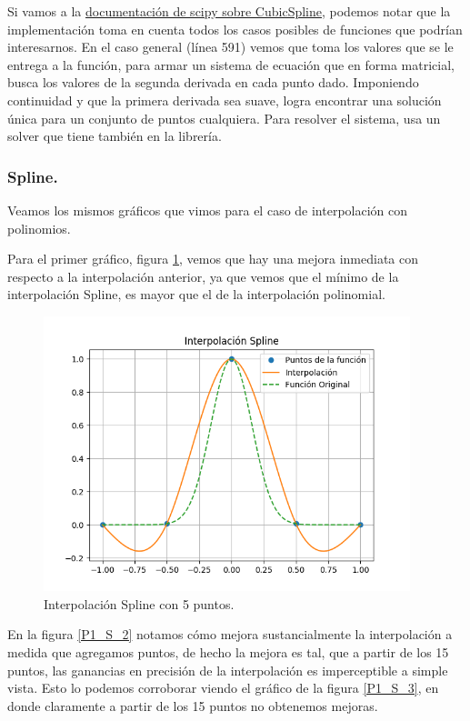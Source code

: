\documentclass[letter, 11pt]{article}
\begin{document}
Si vamos a la \href{https://github.com/scipy/scipy/blob/v1.3.0/scipy/interpolate/_cubic.py#L454-L837}{documentación de scipy
sobre CubicSpline}, podemos notar que la implementación toma en
cuenta todos los casos posibles de funciones que podrían
interesarnos. En el caso general (línea 591) vemos que toma los
valores que se le entrega a la función, para armar un sistema de
ecuación que en forma matricial, busca los valores de la segunda
derivada en cada punto dado. Imponiendo continuidad y que la
primera derivada sea suave, logra encontrar una solución única
para un conjunto de puntos cualquiera. Para resolver el sistema,
usa un solver que tiene también en la librería.


\subsubsection{Spline.}
Veamos los mismos gráficos que vimos para el caso de
interpolación con polinomios.

Para el primer gráfico, figura \ref{P1_S_1}, vemos que hay una
mejora inmediata con respecto a la interpolación anterior, ya
que vemos que el mínimo de la interpolación Spline, es mayor que
el de la interpolación polinomial.

\begin{figure}[H]
  \centering
  \includegraphics[height=8cm]{P1_S_1.png}
  \caption{Interpolación Spline con 5 puntos.}
  \label{P1_S_1}
\end{figure}



En la figura \ref{P1_S_2} notamos cómo mejora sustancialmente la interpolación a medida que agregamos puntos, de hecho la mejora es tal, que a partir de los 15 puntos, las ganancias en precisión de la interpolación es imperceptible a simple vista.
Esto lo podemos corroborar viendo el gráfico de la figura \ref{P1_S_3}, en donde claramente a partir de los 15 puntos no obtenemos mejoras.
\end{document}
